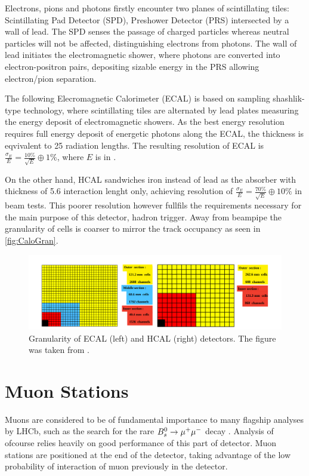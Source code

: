 Electrons, pions and photons firstly encounter two planes of scintillating tiles: Scintillating Pad Detector (\Gls{SPD}), Preshower Detector (\Gls{PRS}) intersected by a wall of lead. The \Gls{SPD} senses the passage of charged particles whereas neutral particles will not be affected, distinguishing electrons from photons. The wall of lead initiates the electromagnetic shower, where photons are converted into electron-positron pairs, depositing sizable energy in the \Gls{PRS} allowing electron/pion separation. 

The following Elecromagnetic Calorimeter (\Gls{ECAL}) is based on sampling shashlik-type technology, where scintillating tiles are alternated by lead plates measuring the energy deposit of electromagnetic showers. As the best energy resolution requires full energy deposit of energetic photons along the \Gls{ECAL}, the thickness is eqvivalent to 25 radiation lengths. The resulting resolution of \Gls{ECAL} is $\frac{\sigma_{E}}{E} = \frac{10\%}{\sqrt{E}} \oplus 1\%$, where $E$ is in \gev.

On the other hand, \Gls{HCAL} sandwiches iron instead of lead as the absorber with thickness of 5.6 interaction lenght only, achieving resolution of $\frac{\sigma_{E}}{E} = \frac{70\%}{\sqrt{E}} \oplus 10\%$ in beam tests. This poorer resolution however fullfils the requirements necessary for the main purpose of this detector, hadron trigger. Away from beampipe the granularity of cells is coarser to mirror the track occupancy as seen in \autoref{fig:CaloGran}. 

\begin{figure}[!h]
	\centering
	\includegraphics[width = 1.0\textwidth]{figs/detector/CaloGran.png}%
	\caption{Granularity of \Gls{ECAL} (left) and \Gls{HCAL} (right) detectors. The figure was taken from \cite{det_paper}. }  
	\label{fig:CaloGran}
\end{figure}




\section{Muon Stations}
Muons are considered to be of fundamental importance to many flagship analyses by \Gls{LHCb}, such as the search for the rare ${B}^{0}_{s} \rightarrow \mu^{+} \mu^{-}$ decay . Analysis of \Bmumumu ofcourse relies heavily on good performance of this part of detector. Muon stations are positioned at the end of the detector, taking advantage of the low probability of interaction of muon previously in the detector.

